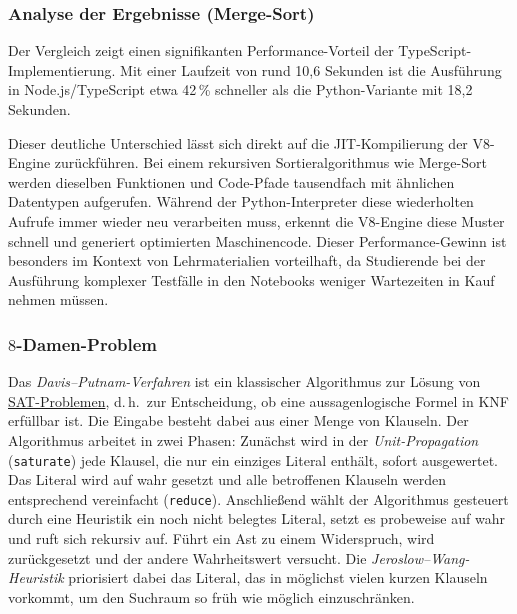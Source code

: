 \subsubsection{Analyse der Ergebnisse (Merge-Sort)}
Der Vergleich zeigt einen signifikanten Performance-Vorteil der TypeScript-Implementierung. Mit einer Laufzeit von rund 10,6 Sekunden ist die Ausführung in Node.js/TypeScript etwa 42\,\% schneller als die Python-Variante mit 18,2 Sekunden. 

Dieser deutliche Unterschied lässt sich direkt auf die JIT-Kompilierung der V8-Engine zurückführen. Bei einem rekursiven Sortieralgorithmus wie Merge-Sort werden dieselben Funktionen und Code-Pfade tausendfach mit ähnlichen Datentypen aufgerufen. Während der Python-Interpreter diese wiederholten Aufrufe immer wieder neu verarbeiten muss, erkennt die V8-Engine diese Muster schnell und generiert optimierten Maschinencode. Dieser Performance-Gewinn ist besonders im Kontext von Lehrmaterialien vorteilhaft, da Studierende bei der Ausführung komplexer Testfälle in den Notebooks weniger Wartezeiten in Kauf nehmen müssen.

\subsubsection{\(8\)-Damen-Problem}

Das \emph{Davis--Putnam-Verfahren} ist ein klassischer Algorithmus zur Lösung von \href{https://en.wikipedia.org/wiki/Boolean_satisfiability_problem}{SAT-Problemen}, d.\,h.\ zur Entscheidung, ob eine aussagenlogische Formel in \ac{KNF} erfüllbar ist. Die Eingabe besteht dabei aus einer Menge von Klauseln. Der Algorithmus arbeitet in zwei Phasen: Zunächst wird in der \emph{Unit-Propagation} (\texttt{saturate}) jede Klausel, die nur ein einziges Literal enthält, sofort ausgewertet. Das Literal wird auf wahr gesetzt und alle betroffenen Klauseln werden entsprechend vereinfacht (\texttt{reduce}). Anschließend wählt der Algorithmus gesteuert durch eine Heuristik ein noch nicht belegtes Literal, setzt es probeweise auf wahr und ruft sich rekursiv auf. Führt ein Ast zu einem Widerspruch, wird zurückgesetzt und der andere Wahrheitswert versucht. Die \emph{Jeroslow--Wang-Heuristik} priorisiert dabei das Literal, das in möglichst vielen kurzen Klauseln vorkommt, um den Suchraum so früh wie möglich einzuschränken.

